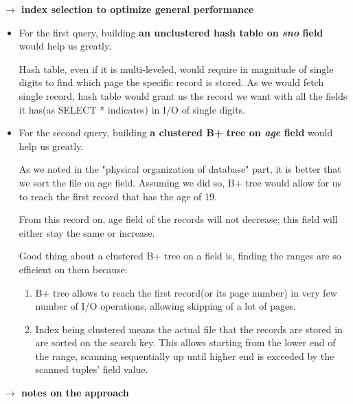 \documentclass[10pt]{article}
\begin{document}
	\bigskip
	
	\textbf{$\rightarrow$ index selection to optimize general performance}
	
	\begin{addmargin}[1em]{2em}
		\bigskip
		
		\begin{itemize}
			\item For the first query, building \textbf{an unclustered hash table on \textit{sno} field} would help us greatly.
			
				Hash table, even if it is multi-leveled, would require in magnitude of single digits to find which page the specific record is stored. As we would fetch single record, hash table would grant us the record we want with all the fields it has(as SELECT * indicates) in I/O of single digits.
				
			\item For the second query, building \textbf{a clustered B+ tree on \textit{age} field} would help us greatly.
			
			As we noted in the "physical organization of database" part, it is better that we sort the file on age field. Assuming we did so, B+ tree would allow for us to reach the first record that has the age of 19.
			
			From this record on, age field of the records will not decrease; this field will either stay the same or increase.
			
			Good thing about a clustered B+ tree on a field is, finding the ranges are so efficient on them because:
			\begin{enumerate}[1)]
				\item B+ tree allows to reach the first record(or its page number) in very few number of I/O operations, allowing skipping of a lot of pages.
				
				\item Index being clustered means the actual file that the records are stored in are sorted on the search key. This allows starting from the lower end of the range, scanning sequentially up until higher end is exceeded by the scanned tuples' field value.
			\end{enumerate}
		\end{itemize}
	
	\end{addmargin}
	\bigskip
	\textbf{$\rightarrow$ notes on the approach}
	
\end{document}
